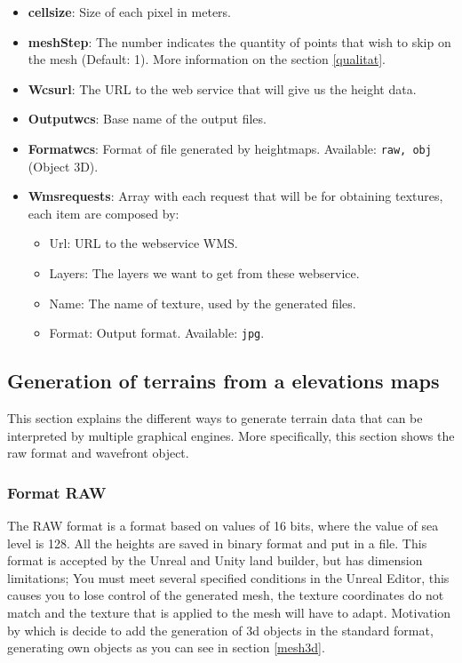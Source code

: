 \documentclass[10pt,a4paper,twocolumn,twoside]{article}
\begin{document}
\begin{itemize}
  \item \textbf{cellsize}: Size of each pixel in meters.
  \item \textbf{meshStep}: The number indicates the quantity of points that wish to skip on the mesh (Default: 1). More information on the section \ref{qualitat}.
  \item \textbf{Wcsurl}: The URL to the web service that will give us the height data.
  \item \textbf{Outputwcs}: Base name of the output files.
  \item \textbf{Formatwcs}: Format of file generated by heightmaps. Available: {\tt raw, obj} (Object 3D).

  \item \textbf{Wmsrequests}: Array with each request that will be for obtaining textures, each item are composed by:
  
  \begin{itemize}
  \setlength\itemsep{0em}
    \item Url: URL to the webservice WMS.
    \item Layers: The layers we want to get from these webservice.
    \item Name: The name of texture, used by the generated files.
    \item Format: Output format. Available: {\tt jpg}.
  \end{itemize}
  
\end{itemize}

\subsection{Generation of terrains from a elevations maps}

This section explains the different ways to generate terrain data that can be interpreted by multiple graphical engines. More specifically, this section shows the raw format and wavefront object.

\subsubsection{Format RAW}

The RAW format is a format based on values of 16 bits, where the value of sea level is 128. All the heights are saved in binary format and put in a file. This format is accepted by the Unreal and Unity land builder, but has dimension limitations; You must meet several specified conditions in the Unreal Editor, this causes you to lose control of the generated mesh, the texture coordinates do not match and the texture that is applied to the mesh will have to adapt. Motivation by which is decide to add the generation of 3d objects in the standard format, generating own objects as you can see in section \ref{mesh3d}.
\end{document}
